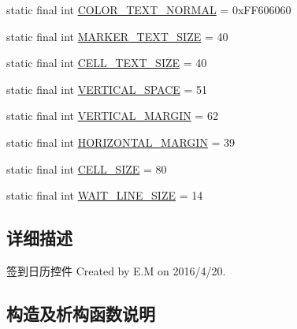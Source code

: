 \begin{DoxyCompactItemize}
static final int \mbox{\hyperlink{classcom_1_1example_1_1akisame__lin_1_1love__air2_1_1_bean_1_1_sign_view_a47d0a01c965212f73d815ccd08206c8f}{C\+O\+L\+O\+R\+\_\+\+T\+E\+X\+T\+\_\+\+N\+O\+R\+M\+AL}} = 0x\+F\+F606060
\item 
static final int \mbox{\hyperlink{classcom_1_1example_1_1akisame__lin_1_1love__air2_1_1_bean_1_1_sign_view_a5d02e0eef541338bbd311ff4a0dd7da3}{M\+A\+R\+K\+E\+R\+\_\+\+T\+E\+X\+T\+\_\+\+S\+I\+ZE}} = 40
\item 
static final int \mbox{\hyperlink{classcom_1_1example_1_1akisame__lin_1_1love__air2_1_1_bean_1_1_sign_view_acb230b2b455bb0240bd947fa66607add}{C\+E\+L\+L\+\_\+\+T\+E\+X\+T\+\_\+\+S\+I\+ZE}} = 40
\item 
static final int \mbox{\hyperlink{classcom_1_1example_1_1akisame__lin_1_1love__air2_1_1_bean_1_1_sign_view_a859c2b3aa1f574f546b6e024d42ac4d7}{V\+E\+R\+T\+I\+C\+A\+L\+\_\+\+S\+P\+A\+CE}} = 51
\item 
static final int \mbox{\hyperlink{classcom_1_1example_1_1akisame__lin_1_1love__air2_1_1_bean_1_1_sign_view_a073d448ed72565cbe258a2dae1a4d359}{V\+E\+R\+T\+I\+C\+A\+L\+\_\+\+M\+A\+R\+G\+IN}} = 62
\item 
static final int \mbox{\hyperlink{classcom_1_1example_1_1akisame__lin_1_1love__air2_1_1_bean_1_1_sign_view_a030116ee5440493fc268ef94696503b9}{H\+O\+R\+I\+Z\+O\+N\+T\+A\+L\+\_\+\+M\+A\+R\+G\+IN}} = 39
\item 
static final int \mbox{\hyperlink{classcom_1_1example_1_1akisame__lin_1_1love__air2_1_1_bean_1_1_sign_view_ab71e00ca02d258ba5b6792371577ef21}{C\+E\+L\+L\+\_\+\+S\+I\+ZE}} = 80
\item 
static final int \mbox{\hyperlink{classcom_1_1example_1_1akisame__lin_1_1love__air2_1_1_bean_1_1_sign_view_a544e1e69c3fcbf06b868dceb1329e409}{W\+A\+I\+T\+\_\+\+L\+I\+N\+E\+\_\+\+S\+I\+ZE}} = 14
\end{DoxyCompactItemize}


\subsection{详细描述}
签到日历控件 Created by E.\+M on 2016/4/20. 

\subsection{构造及析构函数说明}
\mbox{\label{classcom_1_1example_1_1akisame__lin_1_1love__air2_1_1_bean_1_1_sign_view_a7eb7f73836001c43c61d190f1444e662}} 
